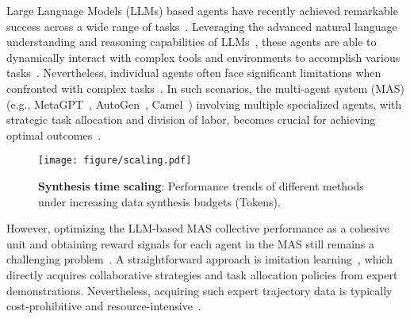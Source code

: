 
Large Language Models (LLMs) based agents have recently achieved remarkable success across a wide range of tasks~\cite{202412.2294, Wang_2024, xi2023risepotentiallargelanguage, zhang2024largelanguagemodelbrainedgui}. Leveraging the advanced natural language understanding and reasoning capabilities of LLMs~\cite{DBLP:journals/corr/abs-2303-08774, DBLP:conf/nips/Wei0SBIXCLZ22}, these agents are able to dynamically interact with complex tools and environments to accomplish various tasks~\cite{ DBLP:journals/corr/abs-2310-05915, DBLP:conf/iclr/YaoZYDSN023}. Nevertheless, individual agents often face significant limitations when confronted with complex tasks~\cite{DBLP:conf/emnlp/ShiYWWF24}. In such scenarios, the multi-agent system (MAS) (e.g., MetaGPT~\cite{DBLP:conf/iclr/HongZCZCWZWYLZR24}, AutoGen~\cite{DBLP:journals/corr/abs-2308-08155}, Camel~\cite{DBLP:conf/nips/LiHIKG23}) involving multiple specialized agents, with strategic task allocation and division of labor, becomes crucial for achieving optimal outcomes~\cite{DBLP:conf/ijcai/GuoCWCPCW024}.

\begin{figure}[t]
    \centering
    \texttt{[image: figure/scaling.pdf]}
    \caption{\textbf{Synthesis time scaling}: Performance trends of different methods under increasing data synthesis budgets (Tokens). } \vspace{-0.3cm}
    \label{fig:scaling}
\end{figure}

However, optimizing the LLM-based MAS collective performance as a cohesive unit and obtaining reward signals for each agent in the MAS still remains a challenging problem~\cite{DBLP:journals/corr/abs-2410-08115}. A straightforward approach is imitation learning~\cite{DBLP:conf/icml/LeY0L17, DBLP:conf/acl/ZengLLWLD024}, which directly acquires collaborative strategies and task allocation policies from expert demonstrations. Nevertheless, acquiring such expert trajectory data is typically cost-prohibitive and resource-intensive~\cite{DBLP:journals/corr/abs-2409-00134}.


